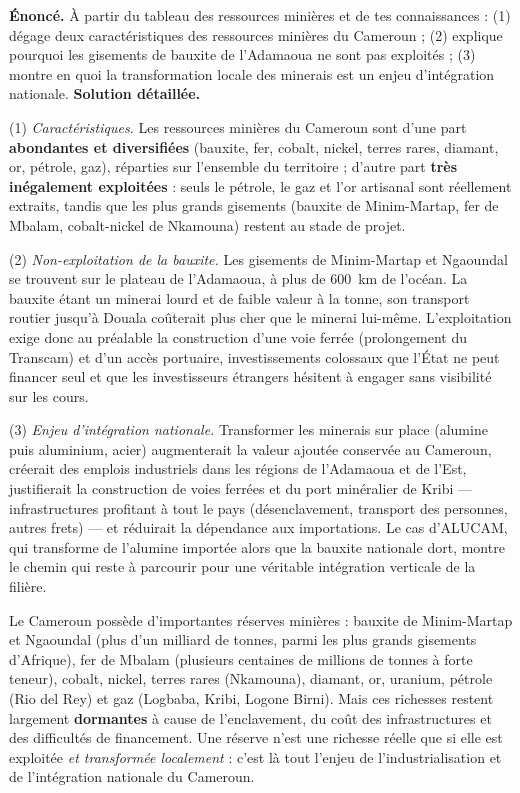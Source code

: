 \documentclass[11pt]{article}
\begin{document}
\begin{exoresolu}
\textbf{Énoncé.} À partir du tableau des ressources minières et de tes connaissances : (1) dégage deux caractéristiques des ressources minières du Cameroun ; (2) explique pourquoi les gisements de bauxite de l'Adamaoua ne sont pas exploités ; (3) montre en quoi la transformation locale des minerais est un enjeu d'intégration nationale.
\tcblower
\textbf{Solution détaillée.}

(1) \emph{Caractéristiques.} Les ressources minières du Cameroun sont d'une part \textbf{abondantes et diversifiées} (bauxite, fer, cobalt, nickel, terres rares, diamant, or, pétrole, gaz), réparties sur l'ensemble du territoire ; d'autre part \textbf{très inégalement exploitées} : seuls le pétrole, le gaz et l'or artisanal sont réellement extraits, tandis que les plus grands gisements (bauxite de Minim-Martap, fer de Mbalam, cobalt-nickel de Nkamouna) restent au stade de projet.

(2) \emph{Non-exploitation de la bauxite.} Les gisements de Minim-Martap et Ngaoundal se trouvent sur le plateau de l'Adamaoua, à plus de \SI{600}{km} de l'océan. La bauxite étant un minerai lourd et de faible valeur à la tonne, son transport routier jusqu'à Douala coûterait plus cher que le minerai lui-même. L'exploitation exige donc au préalable la construction d'une voie ferrée (prolongement du Transcam) et d'un accès portuaire, investissements colossaux que l'État ne peut financer seul et que les investisseurs étrangers hésitent à engager sans visibilité sur les cours.

(3) \emph{Enjeu d'intégration nationale.} Transformer les minerais sur place (alumine puis aluminium, acier) augmenterait la valeur ajoutée conservée au Cameroun, créerait des emplois industriels dans les régions de l'Adamaoua et de l'Est, justifierait la construction de voies ferrées et du port minéralier de Kribi — infrastructures profitant à tout le pays (désenclavement, transport des personnes, autres frets) — et réduirait la dépendance aux importations. Le cas d'ALUCAM, qui transforme de l'alumine importée alors que la bauxite nationale dort, montre le chemin qui reste à parcourir pour une véritable intégration verticale de la filière.
\end{exoresolu}

\begin{aretenir}
Le Cameroun possède d'importantes réserves minières : bauxite de Minim-Martap et Ngaoundal (plus d'un milliard de tonnes, parmi les plus grands gisements d'Afrique), fer de Mbalam (plusieurs centaines de millions de tonnes à forte teneur), cobalt, nickel, terres rares (Nkamouna), diamant, or, uranium, pétrole (Rio del Rey) et gaz (Logbaba, Kribi, Logone Birni). Mais ces richesses restent largement \textbf{dormantes} à cause de l'enclavement, du coût des infrastructures et des difficultés de financement. Une réserve n'est une richesse réelle que si elle est exploitée \emph{et transformée localement} : c'est là tout l'enjeu de l'industrialisation et de l'intégration nationale du Cameroun.
\end{aretenir}
\end{document}
